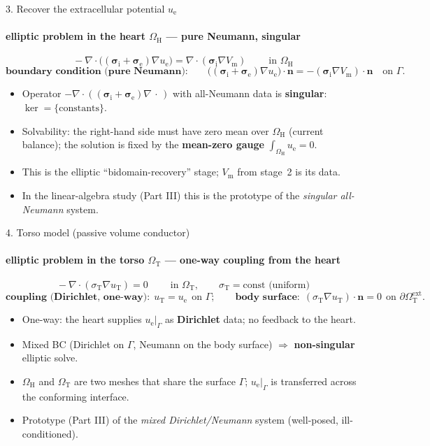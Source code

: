 \documentclass[aspectratio=169,10pt]{beamer}
\newcommand{\Vm}{V_{\mathrm m}}
\newcommand{\ue}{u_{\mathrm e}}
\newcommand{\uT}{u_{\mathrm T}}
\newcommand{\si}{\bm\sigma_{\mathrm i}}
\newcommand{\se}{\bm\sigma_{\mathrm e}}
\newcommand{\sT}{\sigma_{\mathrm T}}
\newcommand{\OH}{\Omega_{\mathrm H}}
\newcommand{\OT}{\Omega_{\mathrm T}}
\newcommand{\nn}{\mathbf n}
\begin{document}
\begin{frame}{3. Recover the extracellular potential $\ue$}
\framesubtitle{elliptic problem in the heart $\OH$ --- pure Neumann, singular}
\[
\boxed{\;-\nabla\!\cdot\big((\si+\se)\nabla \ue\big)=\nabla\!\cdot(\si\nabla \Vm)\;}\qquad\text{in }\OH
\]
\[
\textbf{boundary condition (pure Neumann):}\qquad
\big((\si+\se)\nabla \ue\big)\cdot\nn=-(\si\nabla \Vm)\cdot\nn\quad\text{on }\Gamma .
\]
\begin{itemize}\itemsep0.3em
  \item Operator $-\nabla\!\cdot((\si+\se)\nabla\,\cdot\,)$ with all-Neumann data is \textbf{singular}: $\ker=\{\text{constants}\}$.
  \item Solvability: the right-hand side must have zero mean over $\OH$ (current balance); the solution is fixed by the \textbf{mean-zero gauge} $\int_{\OH}\ue=0$.
  \item This is the elliptic ``bidomain-recovery'' stage; $\Vm$ from stage~2 is its data.
  \item In the linear-algebra study (Part III) this is the prototype of the \emph{singular all-Neumann} system.
\end{itemize}
\end{frame}

\begin{frame}{4. Torso model (passive volume conductor)}
\framesubtitle{elliptic problem in the torso $\OT$ --- one-way coupling from the heart}
\[
\boxed{\;-\nabla\!\cdot(\sT\nabla \uT)=0\;}\qquad\text{in }\OT,\qquad \sT=\text{const (uniform)}
\]
\[
\textbf{coupling (Dirichlet, one-way):}\ \ \uT=\ue\ \ \text{on }\Gamma;
\qquad
\textbf{body surface:}\ \ (\sT\nabla \uT)\cdot\nn=0\ \ \text{on }\partial\OT^{\mathrm{ext}}.
\]
\begin{itemize}\itemsep0.3em
  \item One-way: the heart supplies $\ue|_\Gamma$ as \textbf{Dirichlet} data; no feedback to the heart.
  \item Mixed BC (Dirichlet on $\Gamma$, Neumann on the body surface) $\Rightarrow$ \textbf{non-singular} elliptic solve.
  \item $\OH$ and $\OT$ are two meshes that share the surface $\Gamma$; $\ue|_\Gamma$ is transferred across the conforming interface.
  \item Prototype (Part III) of the \emph{mixed Dirichlet/Neumann} system (well-posed, ill-conditioned).
\end{itemize}
\end{frame}
\end{document}
